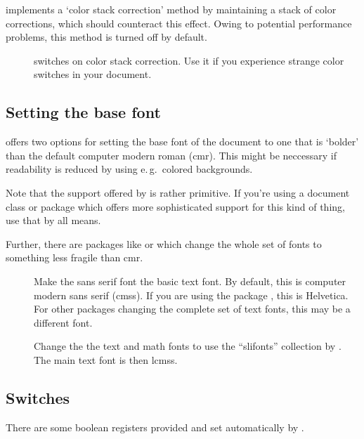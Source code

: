  implements a `color stack correction' method by maintaining a stack of color corrections, which should
counteract this effect. Owing to potential performance problems, this method is turned off by default. 
\begin{description}
\item[] switches on color stack correction. Use it if you experience strange color
  switches in your document.
\end{description}

\newslide

\subsection{Setting the base font}
 offers two options for setting the base font of the document to one that is `bolder' than the default
computer modern roman (cmr). This might be neccessary if readability is reduced by using e.\,g.\ colored backgrounds.

Note that the support offered by  is rather primitive. If you're using a document class or package which
offers more sophisticated support for this kind of thing, use that by all means.

Further, there are packages like  or  which change the whole set of fonts to something less
fragile than cmr.

\begin{description}
\item[] Make the sans serif font the basic text font. By default, this is computer modern
  sans serif (cmss). If you are using the package , this is Helvetica. For other packages changing the
  complete set of text fonts, this may be a different font.
  
\item[] Change the the text and math fonts to use the ``slifonts'' collection by
  . The main text font is then lcmss.
\end{description}

\newslide

\subsection{Switches}
There are some boolean registers provided and set automatically by .

